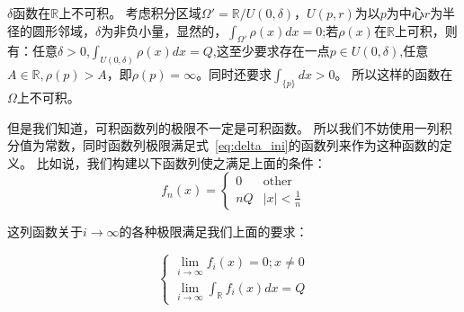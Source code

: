 \documentclass[lang=cn,10pt,newtx,bibend=biber,device=pad]{elegantbook}
\begin{document}
\begin{lemma}[不可积性]
    $\delta$函数在$\mathbb{R}$上不可积。
    考虑积分区域$\Omega' = \mathbb{R}/U(0,\delta)$，$U(p,r)$为以$p$为中心$r$为半径的圆形邻域，$\delta$为非负小量，显然的，$\int_{\Omega'}\rho(x)dx= 0$;若$\rho(x)$在$\mathbb{R}$上可积，则有：任意$\delta>0$,$\int_{U(0,\delta)}\rho(x)dx=Q$,这至少要求存在一点$p\in U(0,\delta)$,任意$A \in \mathbb{R},\rho(p)>A$，即$\rho(p)= \infty$。同时还要求$\int_{\{p\}} dx > 0$。
    所以这样的函数在$\Omega$上不可积。
\end{lemma}
但是我们知道，可积函数列的极限不一定是可积函数。
所以我们不妨使用一列积分值为常数，同时函数列极限满足式~\ref{eq:delta_ini}的函数列来作为这种函数的定义。
比如说，我们构建以下函数列使之满足上面的条件：
\begin{equation}
    f_n(x) =  \begin{cases} 0 &\text{other}\\ nQ &\text{$|x|<\frac{1}{n}$}  \end{cases}
\end{equation}

这列函数关于$i\rightarrow \infty$的各种极限满足我们上面的要求：

\begin{equation}
\begin{cases}
    \lim\limits_{i\rightarrow\infty}f_i(x)=0;x\neq0\\
\lim\limits_{i\rightarrow\infty}\int_{\mathbb{R}}f_i(x)dx = Q
\end{cases}
\end{equation}
\end{document}
